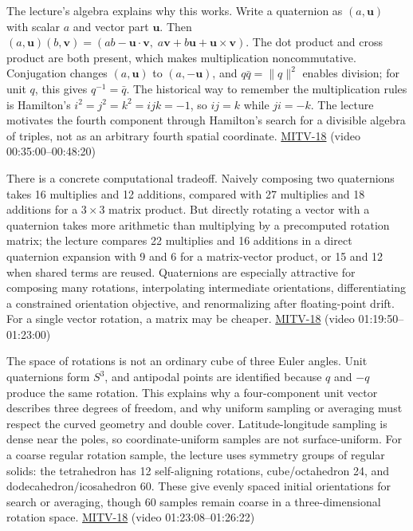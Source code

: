 The lecture's algebra explains why this works. Write a quaternion as \((a,\mathbf{u})\) with scalar \(a\) and vector part \(\mathbf{u}\). Then \((a,\mathbf{u})(b,\mathbf{v})=(ab-\mathbf{u}\cdot\mathbf{v},\;a\mathbf{v}+b\mathbf{u}+\mathbf{u}\times\mathbf{v})\). The dot product and cross product are both present, which makes multiplication noncommutative. Conjugation changes \((a,\mathbf{u})\) to \((a,-\mathbf{u})\), and \(q\bar q=\|q\|^2\) enables division; for unit \(q\), this gives \(q^{-1}=\bar q\). The historical way to remember the multiplication rules is Hamilton's \(i^2=j^2=k^2=ijk=-1\), so \(ij=k\) while \(ji=-k\). The lecture motivates the fourth component through Hamilton's search for a divisible algebra of triples, not as an arbitrary fourth spatial coordinate. \hyperref[04-visual-computing-ii-ch036-mitv-18---rotation-and-how-to-represent-it-unit-quaternions-the-space-of-rotations]{MITV-18} (video 00:35:00--00:48:20)

There is a concrete computational tradeoff. Naively composing two quaternions takes 16 multiplies and 12 additions, compared with 27 multiplies and 18 additions for a \(3\times3\) matrix product. But directly rotating a vector with a quaternion takes more arithmetic than multiplying by a precomputed rotation matrix; the lecture compares 22 multiplies and 16 additions in a direct quaternion expansion with 9 and 6 for a matrix-vector product, or 15 and 12 when shared terms are reused. Quaternions are especially attractive for composing many rotations, interpolating intermediate orientations, differentiating a constrained orientation objective, and renormalizing after floating-point drift. For a single vector rotation, a matrix may be cheaper. \hyperref[04-visual-computing-ii-ch036-mitv-18---rotation-and-how-to-represent-it-unit-quaternions-the-space-of-rotations]{MITV-18} (video 01:19:50--01:23:00)

The space of rotations is not an ordinary cube of three Euler angles. Unit quaternions form \(S^3\), and antipodal points are identified because \(q\) and \(-q\) produce the same rotation. This explains why a four-component unit vector describes three degrees of freedom, and why uniform sampling or averaging must respect the curved geometry and double cover. Latitude-longitude sampling is dense near the poles, so coordinate-uniform samples are not surface-uniform. For a coarse regular rotation sample, the lecture uses symmetry groups of regular solids: the tetrahedron has 12 self-aligning rotations, cube/octahedron 24, and dodecahedron/icosahedron 60. These give evenly spaced initial orientations for search or averaging, though 60 samples remain coarse in a three-dimensional rotation space. \hyperref[04-visual-computing-ii-ch036-mitv-18---rotation-and-how-to-represent-it-unit-quaternions-the-space-of-rotations]{MITV-18} (video 01:23:08--01:26:22)

